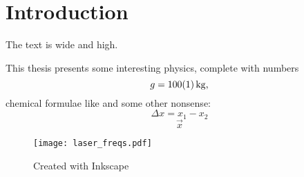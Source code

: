\chapter{Introduction}\label{ch:introduction}
The text is \the\textwidth {} wide and \the\textheight {} high.

This thesis presents some interesting physics, complete with numbers
\begin{equation}
   g = \SI{100+-1}{kg}\text{,}
\end{equation}
chemical formulae like  and some other nonsense:
\begin{equation}
   \Delta x = x_1 - x_2
\end{equation}
\begin{equation}
\vec{x}
\end{equation}

\begin{figure}[tb]
	\centering
		\texttt{[image: laser\_freqs.pdf]}
	\caption{Created with Inkscape}
\end{figure}

